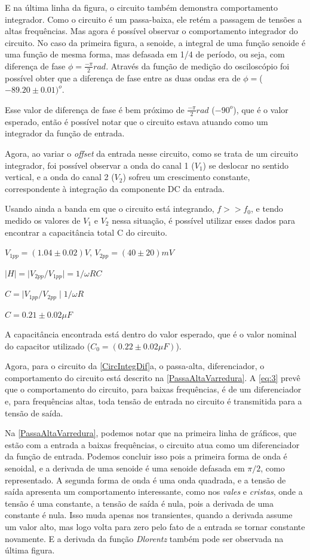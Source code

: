 \documentclass[11pt,a4paper]{article}
\begin{document}
    E na última linha da figura, o circuito também demonstra comportamento integrador. Como o circuito é um passa-baixa, ele retém a passagem de tensões a altas frequências. Mas agora é possível observar o comportamento integrador do circuito. No caso da primeira figura, a senoide, a integral de uma função senoide é uma função de mesma forma, mas defasada em 1/4 de período, ou seja, com diferença de fase $\phi =\frac {-\pi} {2} rad$.
    Através da função de medição do osciloscópio foi possível obter que a diferença de fase entre as duas ondas era de $\phi =$($-89.20 \pm 0.01$$)^o$.
    
    Esse valor de diferença de fase é bem próximo de $\frac{-\pi}{2} rad$ ($-90^o$), que é o valor esperado, então é possível notar que o circuito estava atuando como um integrador da função de entrada.
    
    Agora, ao variar o \textit{offset} da entrada nesse circuito, como se trata de um circuito integrador, foi possível observar a onda do canal 1 ($V_1$) se deslocar no sentido vertical, e a onda do canal 2 ($V_2$) sofreu um crescimento constante, correspondente à integração da componente DC da entrada.
    
    Usando ainda a banda em que o circuito está integrando, $f>>f_0$, e tendo medido os valores de $V_1$ e $V_2$ nessa situação, é possível utilizar esses dados para encontrar a capacitância total C do circuito.
    
    $V_{1pp}=(1.04 \pm 0.02)V$, $V_{2pp}=(40 \pm 20)mV$
    
    $\mid H \mid = \mid V_{2pp}/V_{1pp} \mid = 1/\omega RC$
    
    $C = \mid V_{1pp}/V_{2pp} \mid 1/\omega R$
    
    $C = 0.21 \pm 0.02 \mu F$
    
    A capacitância encontrada está dentro do valor esperado, que é o valor nominal do capacitor utilizado ($C_0 = (0.22 \pm 0.02 \mu F)$).
    
    Agora, para o circuito da \cref{CircIntegDif}a, o passa-alta, diferenciador, o comportamento do circuito está descrito na \cref{PassaAltaVarredura}. A \cref{eq:3} prevê que o comportamento do circuito, para baixas frequências, é de um diferenciador e, para frequências altas, toda tensão de entrada no circuito é transmitida para a tensão de saída.
    
    Na \cref{PassaAltaVarredura}, podemos notar que na primeira linha de gráficos, que estão com a entrada a baixas frequências, o circuito atua como um diferenciador da função de entrada. Podemos concluir isso pois a primeira forma de onda é senoidal, e a derivada de uma senoide é uma senoide defasada em $\pi /2$, como representado. A segunda forma de onda é uma onda quadrada, e a tensão de saída apresenta um comportamento interessante, como nos \textit{vales} e \textit{cristas}, onde a tensão é uma constante, a tensão de saída é nula, pois a derivada de uma constante é nula. Isso muda apenas nos transientes, quando a derivada assume um valor alto, mas logo volta para zero pelo fato de a entrada se tornar constante novamente. E a derivada da função \textit{Dlorentz} também pode ser observada na última figura.
    
\end{document}
